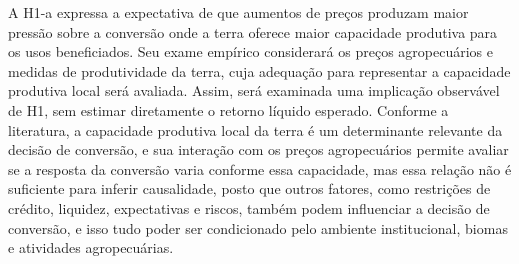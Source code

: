 %
%
%
%

A H1-a expressa a expectativa de que aumentos de preços produzam maior pressão sobre a conversão onde a terra oferece maior capacidade produtiva para os usos beneficiados. Seu exame empírico considerará os preços agropecuários e medidas de produtividade da terra, cuja adequação para representar a capacidade produtiva local será avaliada. Assim, será examinada uma implicação observável de H1, sem estimar diretamente o retorno líquido esperado. Conforme a literatura, a capacidade produtiva local da terra é um determinante relevante da decisão de conversão, e sua interação com os preços agropecuários permite avaliar se a resposta da conversão varia conforme essa capacidade, mas essa relação não é suficiente para inferir causalidade, posto que outros fatores, como restrições de crédito, liquidez, expectativas e riscos, também podem influenciar a decisão de conversão, e isso tudo poder ser condicionado pelo ambiente institucional, biomas e atividades agropecuárias.

